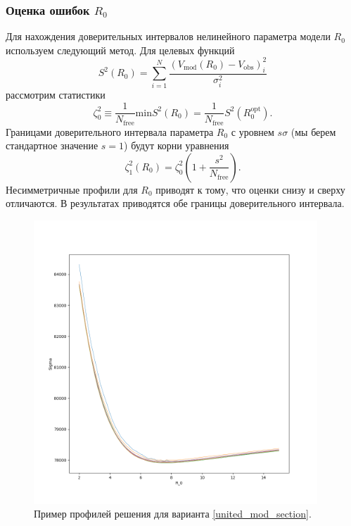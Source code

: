 \documentclass{matmex-diploma-custom}
\begin{document}
\subsubsection{Оценка ошибок $R_0$} \label{err_r0}
Для нахождения доверительных интервалов нелинейного параметра модели $R_0$ используем следующий метод. Для целевых функций
\begin{equation}
        S^2(R_0) = \sum_{i=1}^N \frac{\left(V_{\mathrm{mod}}(R_0) - V_{\mathrm{obs}} \right)^2_i}{\sigma_i^2}
\end{equation}
рассмотрим статистики 
\begin{equation}
        \zeta^2_0 \equiv \frac{1}{N_{\mathrm{free}}} \mathrm{min} S^2(R_0) = \frac{1}{N_{\mathrm{free}}} S^2(R_0^{\mathrm{opt}}).
\end{equation}
Границами доверительного интервала параметра $R_0$ с уровнем $s \sigma$ (мы берем стандартное значение $s = 1$) будут корни уравнения
\begin{equation}
        \zeta^2_1(R_0) = \zeta_0^2 \left( 1 + \frac{s^2}{N_{\mathrm{free}}} \right).
\end{equation}
Несимметричные профили для $R_0$ приводят к тому, что оценки снизу и сверху отличаются. В результатах приводятся обе границы доверительного интервала. 


\begin{figure}[h!]
        \begin{center}
\begin{minipage}[h]{0.4\linewidth}
        \includegraphics[width=0.95\textwidth]{../imgs/profiles.png}
\end{minipage}
        \caption{Пример профилей решения для варианта \ref{united_mod_section}.}
        \end{center}
\end{figure}
\end{document}
